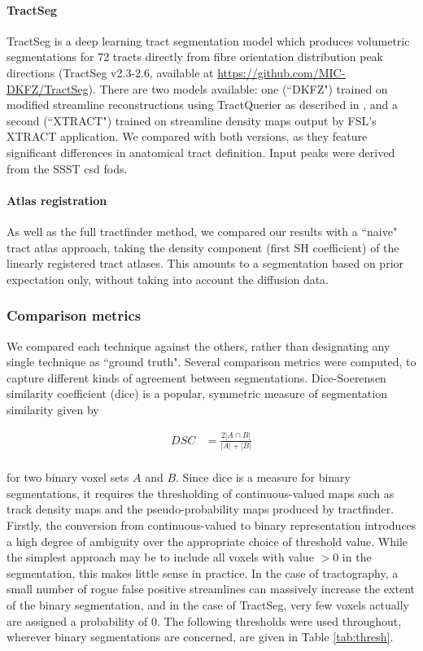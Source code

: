 \paragraph{TractSeg}

TractSeg \autocite{Wasserthal2018} is a deep learning tract segmentation model which produces volumetric segmentations for 72 tracts directly from fibre orientation distribution peak directions (TractSeg v2.3-2.6, available at \url{https://github.com/MIC-DKFZ/TractSeg}).
There are two models available: one (``DKFZ") trained on modified streamline reconstructions using TractQuerier \autocite{Wassermann2016} as described in \textcite{Wasserthal2018}, and a second (``XTRACT") trained on streamline density maps output by FSL's XTRACT application. \autocite{Warrington2020}
We compared with both versions, as they feature significant differences in anatomical tract definition.
Input peaks were derived from the SSST \gls{csd} \gls{fod}s.

\paragraph{Atlas registration}

As well as the full tractfinder method, we compared our results with a ``naive" tract atlas approach, taking the density component (first SH coefficient) of the linearly registered tract atlases.
This amounts to a segmentation based on prior expectation only, without taking into account the diffusion data.

\subsubsection{Comparison metrics}

We compared each technique against the others, rather than designating any single technique as ``ground truth".
Several comparison metrics were computed, to capture different kinds of agreement between segmentations.
Dice-Soerensen similarity coefficient (\gls{dice}) \autocite{Dice1945} is a popular, symmetric measure of segmentation similarity given by

\begin{align}
  DSC &= \frac{2 |A \cap B|}{|A| + |B|} \\
\end{align}

for two binary voxel sets $A$ and $B$.
Since \gls{dice} is a measure for binary segmentations, it requires the thresholding of continuous-valued maps such as track density maps and the pseudo-probability maps produced by tractfinder.
Firstly, the conversion from continuous-valued to binary representation introduces a high degree of ambiguity over the appropriate choice of threshold value.
While the simplest approach may be to include all voxels with value $>0$ in the segmentation, this makes little sense in practice.
In the case of tractography, a small number of rogue false positive streamlines can massively increase the extent of the binary segmentation, and in the case of TractSeg, very few voxels actually are assigned a probability of 0.
The following thresholds were used throughout, wherever binary segmentations are concerned, are given in Table \ref{tab:thresh}.

